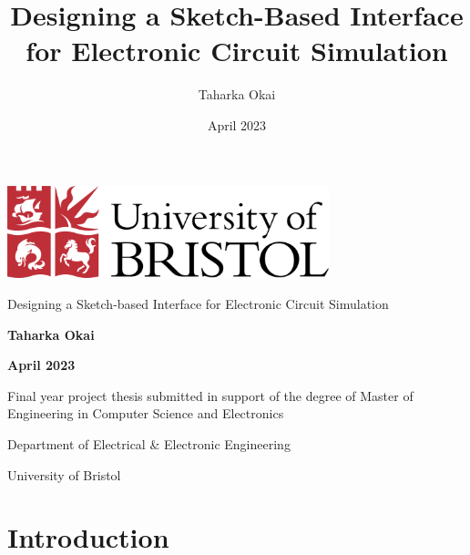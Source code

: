 \documentclass[11pt]{article}
\title{Designing a Sketch-Based Interface for Electronic Circuit Simulation}
\author{Taharka Okai}
\date{April 2023}
\begin{document}
\begin{titlepage}
    \begin{center}
        \vfill
        \includegraphics[width={0.7\textwidth}]{../graphics/university-of-bristol-logo-png-transparent}

        \vfill
        {\Huge{Designing a Sketch-based Interface for Electronic Circuit Simulation}}

        \vfill
        {\Large\textbf{Taharka Okai}}

        \vspace{1cm}
        {\Large{\textbf{April 2023}}}

        \vfill

        \vspace{1cm}
        {\Large{Final year project thesis submitted in support of the
                degree of Master of Engineering in Computer Science and Electronics}}

        \vspace{1cm}
        {\Large{Department of Electrical \& Electronic Engineering}}

        {\Large{University of Bristol}}
    \end{center}
\end{titlepage}


\thispagestyle{empty}
\setcounter{page}{1}

\pagebreak
\tableofcontents
\printnoidxglossary[type=\acronymtype,title=List of Acronyms]

\pagebreak
\begin{abstract}

\end{abstract}

\pagebreak
\section{Introduction}
\label{Introduction}
\end{document}
